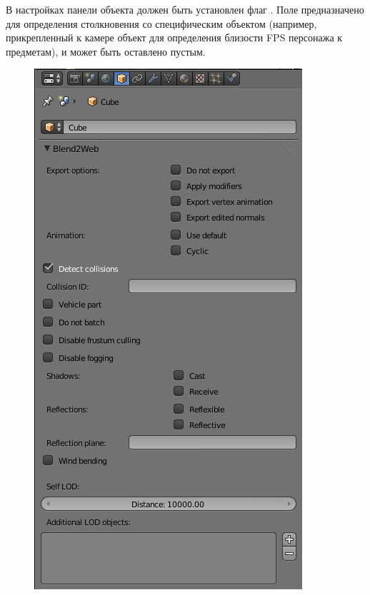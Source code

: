 \documentclass[a4paper,12pt,oneside]{sphinxmanual}
\begin{document}
\begin{DUlineblock}{0em}
\item[] 
\end{DUlineblock}

В настройках панели объекта должен быть установлен флаг . Поле  предназначено для определения столкновения со специфическим объектом (например, прикрепленный к камере объект для определения близости FPS персонажа к предметам), и может быть оставлено пустым.
\begin{figure}[htbp]
\centering

\includegraphics[width=0.800\linewidth]{object.jpg}
\end{figure}
\end{document}
